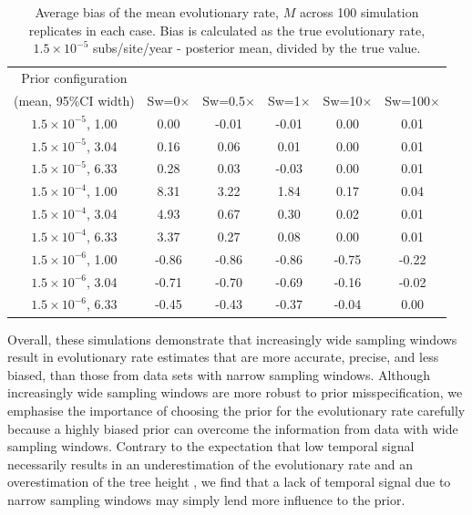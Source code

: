 \documentclass[11pt]{article}
\begin{document}
\begin{table}[H]
	\caption{Average bias of the mean evolutionary rate, $M$ across 100 simulation replicates in each case. Bias is calculated as the true evolutionary rate, $1.5\times 10^{-5}$ subs/site/year - posterior mean, divided by the true value.} 
\begin{center}
	\label{table:bias}
	\begin{tabular}{ c|c|c|c|c|c }
		Prior configuration \\(mean, 95\%CI width) & Sw=0$\times$ & Sw=0.5$\times$ & Sw=1$\times$ & Sw=10$\times$ & Sw=100$\times$ \\
		\hline
		$1.5\times10^{-5}$, 1.00 & 0.00 & -0.01 & -0.01 & 0.00 & 0.01\\
        $1.5\times10^{-5}$, 3.04 & 0.16 & 0.06 & 0.01 & 0.00 & 0.01\\
		$1.5\times10^{-5}$, 6.33 & 0.28 & 0.03 & -0.03 & 0.00 & 0.01\\
		\hline
		$1.5\times10^{-4}$, 1.00 & 8.31 & 3.22 & 1.84 & 0.17 & 0.04\\
        $1.5\times10^{-4}$, 3.04 & 4.93 & 0.67 & 0.30 & 0.02 & 0.01\\
		$1.5\times10^{-4}$, 6.33 & 3.37 & 0.27 & 0.08 & 0.00 & 0.01\\
		\hline
		$1.5\times10^{-6}$, 1.00 & -0.86 & -0.86 & -0.86 & -0.75 & -0.22\\
        $1.5\times10^{-6}$, 3.04 & -0.71 & -0.70 & -0.69 & -0.16 & -0.02\\
		$1.5\times10^{-6}$, 6.33 & -0.45 & -0.43 & -0.37 & -0.04 & 0.00\\
	\end{tabular}
\end{center}
\end{table}

Overall, these simulations demonstrate that increasingly wide sampling windows result in evolutionary rate estimates that are more accurate, precise, and less biased, than those from data sets with narrow sampling windows. Although increasingly wide sampling windows are more robust to prior misspecification, we emphasise the importance of choosing the prior for the evolutionary rate carefully because a highly biased prior can overcome the information from data with wide sampling windows. Contrary to the expectation that low temporal signal necessarily results in an underestimation of the evolutionary rate and an overestimation of the tree height \citep{duchene2015performance}, we find that a lack of temporal signal due to narrow sampling windows may simply lend more influence to the prior. 
\end{document}
